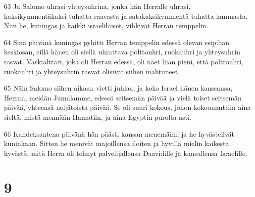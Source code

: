 \par 63 Ja Salomo uhrasi yhteysuhrina, jonka hän Herralle uhrasi, kaksikymmentäkaksi tuhatta raavasta ja satakaksikymmentä tuhatta lammasta. Niin he, kuningas ja kaikki israelilaiset, vihkivät Herran temppelin.
\par 64 Sinä päivänä kuningas pyhitti Herran temppelin edessä olevan esipihan keskiosan, sillä hänen oli siellä uhrattava polttouhri, ruokauhri ja yhteysuhrin rasvat. Vaskialttari, joka oli Herran edessä, oli näet liian pieni, että polttouhri, ruokauhri ja yhteysuhrin rasvat olisivat siihen mahtuneet.
\par 65 Näin Salomo siihen aikaan vietti juhlaa, ja koko Israel hänen kanssansa, Herran, meidän Jumalamme, edessä seitsemän päivää ja vielä toiset seitsemän päivää, yhteensä neljätoista päivää. Se oli suuri kokous, johon kokoonnuttiin aina sieltä, mistä mennään Hamatiin, ja aina Egyptin purolta asti.
\par 66 Kahdeksantena päivänä hän päästi kansan menemään, ja he hyvästelivät kuninkaan. Sitten he menivät majoillensa iloiten ja hyvillä mielin kaikesta hyvästä, mitä Herra oli tehnyt palvelijallensa Daavidille ja kansallensa Israelille.

\chapter{9}

